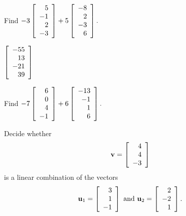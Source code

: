 \begin{enumialphparenastyle}

\begin{ex} Find $-3\left[
\begin{array}{r}
5 \\
-1 \\
2 \\
-3
\end{array}
\right] +5\left[
\begin{array}{r}
-8 \\
2 \\
-3 \\
6
\end{array}
\right] .$ 
\begin{sol}
$\left[
\begin{array}{r}
-55 \\
13 \\
-21 \\
39
\end{array}
\right]$
\end{sol}
\end{ex}

\begin{ex} Find $-7\left[
\begin{array}{r}
6 \\
0 \\
4 \\
-1
\end{array}
\right] +6\left[
\begin{array}{r}
-13 \\
-1 \\
1 \\
6
\end{array}
\right] .$ 
\end{ex}


\begin{ex}
Decide whether 
\begin{equation*}
{\bf v}= \left[
\begin{array}{r}
4 \\
4 \\
-3
\end{array}
\right]
\end{equation*}
is a linear combination of the vectors 
\begin{equation*}
{\bf u}_1 = \left[
\begin{array}{r}
3 \\
1 \\
-1
\end{array}
\right]
\mbox{ and } 
{\bf u}_2 = 
\left[
\begin{array}{r}
2 \\
-2\\
1
\end{array}
\right].
\end{equation*}


\end{ex}
\end{enumialphparenastyle}
